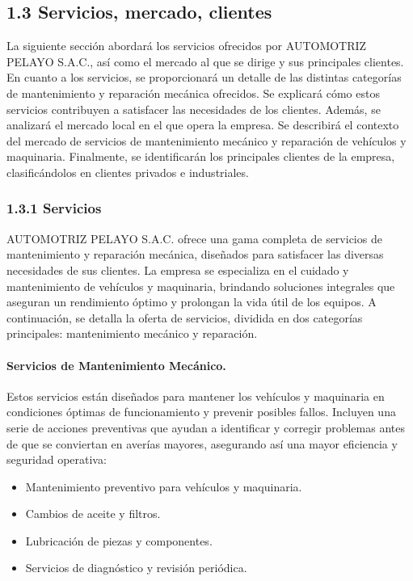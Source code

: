 \subsection{1.3 Servicios, mercado, clientes}
La siguiente sección abordará los servicios ofrecidos por AUTOMOTRIZ PELAYO S.A.C., así como el mercado al que se dirige y sus principales clientes. En cuanto a los servicios, se proporcionará un detalle de las distintas categorías de mantenimiento y reparación mecánica ofrecidos. Se explicará cómo estos servicios contribuyen a satisfacer las necesidades de los clientes. Además, se analizará el mercado local en el que opera la empresa. Se describirá el contexto del mercado de servicios de mantenimiento mecánico y reparación de vehículos y maquinaria. Finalmente, se identificarán los principales clientes de la empresa, clasificándolos en clientes privados e industriales.

\subsubsection*{1.3.1 Servicios}
AUTOMOTRIZ PELAYO S.A.C. ofrece una gama completa de servicios de mantenimiento y reparación mecánica, diseñados para satisfacer las diversas necesidades de sus clientes. La empresa se especializa en el cuidado y mantenimiento de vehículos y maquinaria, brindando soluciones integrales que aseguran un rendimiento óptimo y prolongan la vida útil de los equipos. A continuación, se detalla la oferta de servicios, dividida en dos categorías principales: mantenimiento mecánico y reparación.

\paragraph{Servicios de Mantenimiento Mecánico. }Estos servicios están diseñados para mantener los vehículos y maquinaria en condiciones óptimas de funcionamiento y prevenir posibles fallos. Incluyen una serie de acciones preventivas que ayudan a identificar y corregir problemas antes de que se conviertan en averías mayores, asegurando así una mayor eficiencia y seguridad operativa: 
\begin{itemize}
    \item Mantenimiento preventivo para vehículos y maquinaria.
    \item Cambios de aceite y filtros.
    \item Lubricación de piezas y componentes.
    \item Servicios de diagnóstico y revisión periódica.
\end{itemize}
